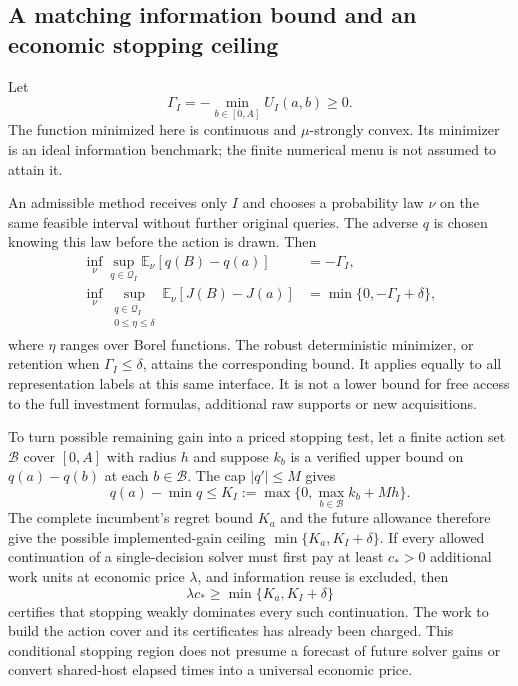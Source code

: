 \subsection{A matching information bound and an economic stopping ceiling}

Let
\[
 \Gamma_I=-\min_{b\in[0,A]}U_I(a,b)\ge0.
\]
The function minimized here is continuous and $\mu$-strongly convex.
Its minimizer is an ideal information benchmark; the finite numerical
menu is not assumed to attain it.

\begin{proposition}
\label{prop:jointminimax124}
An admissible method receives only $I$ and chooses a probability law
$\nu$ on the same feasible interval without further original queries.
The adverse $q$ is chosen knowing this law before the action is drawn.
Then
\begin{align}
 \inf_\nu\sup_{q\in\mathcal Q_I}
       \mathbb E_\nu[q(B)-q(a)]&=-\Gamma_I,\nonumber\\
 \inf_\nu\sup_{\substack{q\in\mathcal Q_I\\0\le\eta\le\delta}}
       \mathbb E_\nu[J(B)-J(a)]
       &=\min\{0,-\Gamma_I+\delta\},
 \label{eq:jointminimax124}
\end{align}
where $\eta$ ranges over Borel functions. The robust deterministic
minimizer, or retention when $\Gamma_I\le\delta$, attains the
corresponding bound. It applies equally to all representation labels
at this same interface. It is not a lower bound for free access to the
full investment formulas, additional raw supports or new acquisitions.
\end{proposition}

To turn possible remaining gain into a priced stopping test, let a finite
action set $\mathcal B$ cover $[0,A]$ with radius $h$ and suppose
$k_b$ is a verified upper bound on $q(a)-q(b)$ at each $b\in\mathcal B$.
The cap $|q'|\le M$ gives
\begin{equation}\label{eq:jointceiling124}
 q(a)-\min q\le
 K_I:=\max\{0,\max_{b\in\mathcal B}k_b+Mh\}.
\end{equation}
The complete incumbent's regret bound $K_a$ and the future allowance
therefore give the possible implemented-gain ceiling
$\min\{K_a,K_I+\delta\}$. If every allowed continuation of a
single-decision solver must first pay at least $c_*>0$ additional work
units at economic price $\lambda$, and information reuse is excluded,
then
\[
 \lambda c_*\ge\min\{K_a,K_I+\delta\}
\]
certifies that stopping weakly dominates every such continuation.
The work to build the action cover and its certificates has already
been charged. This conditional stopping region does not presume a
forecast of future solver gains or convert shared-host elapsed times
into a universal economic price.

